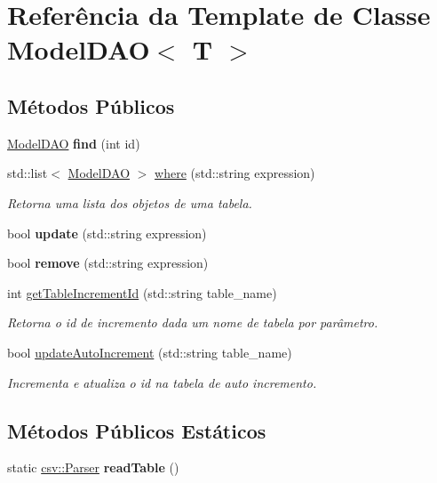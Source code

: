 \hypertarget{classModelDAO}{}\section{Referência da Template de Classe Model\+D\+AO$<$ T $>$}
\label{classModelDAO}
\subsection*{Métodos Públicos}
\begin{DoxyCompactItemize}
\item 
\mbox{\label{classModelDAO_a25e5429057e7735f387fc7e7180be741}} 
\hyperlink{classModelDAO}{Model\+D\+AO} {\bfseries find} (int id)
\item 
std\+::list$<$ \hyperlink{classModelDAO}{Model\+D\+AO} $>$ \hyperlink{classModelDAO_a241c58f7a4fcdbd60ded4cc65a77befd}{where} (std\+::string expression)
\begin{DoxyCompactList}\small\item\em Retorna uma lista dos objetos de uma tabela. \end{DoxyCompactList}\item 
\mbox{\label{classModelDAO_a6dac34cd99166100f3c5b5b048b967b3}} 
bool {\bfseries update} (std\+::string expression)
\item 
\mbox{\label{classModelDAO_adb72057c110a91a3015794a8ec4aa5e9}} 
bool {\bfseries remove} (std\+::string expression)
\item 
int \hyperlink{classModelDAO_a24cf7f88d833dba6424271767403cbda}{get\+Table\+Increment\+Id} (std\+::string table\+\_\+name)
\begin{DoxyCompactList}\small\item\em Retorna o id de incremento dada um nome de tabela por parâmetro. \end{DoxyCompactList}\item 
bool \hyperlink{classModelDAO_af524ba9765af94ca633587d3ecf8964b}{update\+Auto\+Increment} (std\+::string table\+\_\+name)
\begin{DoxyCompactList}\small\item\em Incrementa e atualiza o id na tabela de auto incremento. \end{DoxyCompactList}\end{DoxyCompactItemize}
\subsection*{Métodos Públicos Estáticos}
\begin{DoxyCompactItemize}
\item 
\mbox{\label{classModelDAO_ad34aa526be65334b13793a79f3f6fea9}} 
static \hyperlink{classcsv_1_1Parser}{csv\+::\+Parser} {\bfseries read\+Table} ()
\end{DoxyCompactItemize}



